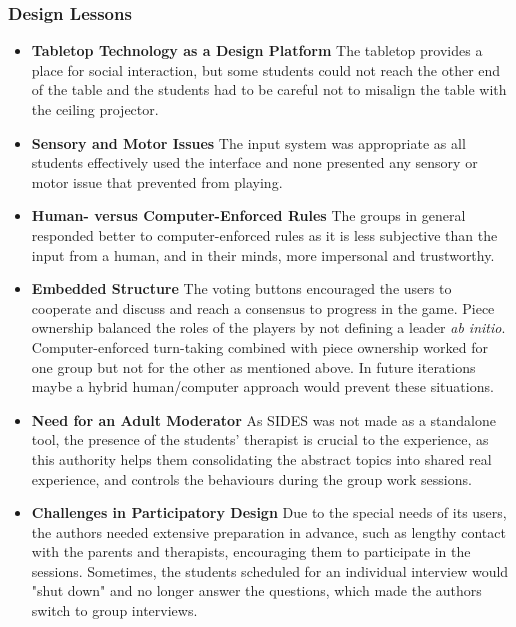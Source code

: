 \documentclass[runningheads]{llncs}
\begin{document}
\subsubsection{Design Lessons}
\begin{itemize}
    \item \par \textbf{Tabletop Technology as a Design Platform} The tabletop provides a place for social interaction, but some students could not reach the other end of the table and the students had to be careful not to misalign the table with the ceiling projector.
    \item \par \textbf{Sensory and Motor Issues} The input system was appropriate as all students effectively used the interface and none presented any sensory or motor issue that prevented from playing.
    \item \par \textbf{Human- versus Computer-Enforced Rules} The groups in general responded better to computer-enforced rules as it is less subjective than the input from a human, and in their minds, more impersonal and trustworthy.
    \item \par \textbf{Embedded Structure} The voting buttons encouraged the users to cooperate and discuss and reach a consensus to progress in the game. Piece ownership balanced the roles of the players by not defining a leader \textit{ab initio}. Computer-enforced turn-taking combined with piece ownership worked for one group but not for the other as mentioned above. In future iterations maybe a hybrid human/computer approach would prevent these situations.
    \item \par \textbf{Need for an Adult Moderator} As SIDES was not made as a standalone tool, the presence of the students' therapist is crucial to the experience, as this authority helps them consolidating the abstract topics into shared real experience, and controls the behaviours during the group work sessions.
    \item \par \textbf{Challenges in Participatory Design} Due to the special needs of its users, the authors needed extensive preparation in advance, such as lengthy contact with the parents and therapists, encouraging them to participate in the sessions. Sometimes, the students scheduled for an individual interview would "shut down" and no longer answer the questions, which made the authors switch to group interviews.
\end{itemize}
\end{document}
